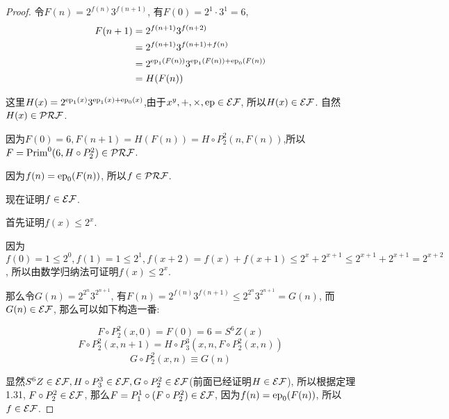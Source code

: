 \begin{proof}
    令$F(n)=2^{f(n)}3^{f(n+1)}$, 有$F(0)=2^1\cdot 3^1=6$,
    $$\begin{aligned}
        F(n+1)&=2^{f(n+1)}3^{f(n+2)}\\
        &=2^{f(n+1)}3^{f(n+1)+f(n)}\\
        &=2^{\mathrm{ep}_1(F(n))}3^{\mathrm{ep}_1(F(n))+\mathrm{ep}_0(F(n))}\\
        &=H(F(n))
    \end{aligned}$$
	
    这里$H(x)=2^{\mathrm{ep}_1(x)}3^{\mathrm{ep}_1(x)+\mathrm{ep}_0(x)}$,由于$x^y,+,\times,\mathrm{ep}\in\mathcal{EF}$, 所以$H(x)\in\mathcal{EF}$. 自然$H(x)\in\mathcal{PRF}$.

    因为$F(0)=6,F(n+1)=H(F(n))=H\circ P_2^2(n,F(n))$,所以$F=\mathrm{Prim}^0(6,H\circ P_2^2)\in\mathcal{PRF}$.
    
    因为$f(n)=\mathrm{ep}_0(F(n))$, 所以$f\in\mathcal{PRF}$.

    现在证明$f\in\mathcal{EF}$.

    首先证明$f(x)\leqslant 2^x$.
    
    因为$f(0)=1\leqslant2^0,f(1)=1\leqslant2^1,f(x+2)=f(x)+f(x+1)\leqslant2^x+2^{x+1}\leq2^{x+1}+2^{x+1}=2^{x+2}$, 所以由数学归纳法可证明$f(x)\leqslant 2^x$.

    那么令$G(n)=2^{2^n}3^{2^{n+1}}$, 有$F(n)=2^{f(n)}3^{f(n+1)}\leqslant2^{2^n}3^{2^{n+1}}=G(n)$, 而$G(n)\in\mathcal{EF}$, 那么可以如下构造一番:

    $$F\circ P^2_2(x, 0)=F(0)=6=S^6Z(x)$$
    $$F\circ P^2_2(x, n+1)=H\circ P_3^3(x, n, F\circ P^2_2(x,n))$$
    $$G\circ P^2_2(x, n)\equiv G(n)$$

    显然$S^6Z\in\mathcal{EF},H\circ P_3^3\in\mathcal{EF},G\circ P^2_2\in\mathcal{EF}$(前面已经证明$H\in\mathcal{EF}$), 所以根据定理1.31, $F\circ P^2_2\in\mathcal{EF}$, 那么$F=P_1^1\circ (F\circ P^2_2)\in\mathcal{EF}$, 因为$f(n)=\mathrm{ep}_0(F(n))$, 所以$f\in\mathcal{EF}$.
\end{proof}